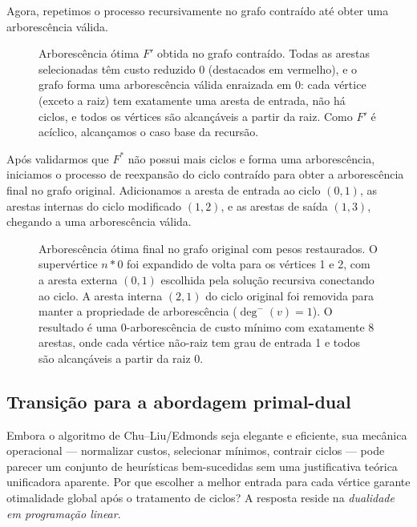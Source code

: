 Agora, repetimos o processo recursivamente no grafo contraído até obter uma arborescência válida.

\begin{figure}[H]
    \centering
    
    \caption{Arborescência ótima $F'$ obtida no grafo contraído. Todas as arestas selecionadas têm custo reduzido 0 (destacados em vermelho), e o grafo forma uma arborescência válida enraizada em 0: cada vértice (exceto a raiz) tem exatamente uma aresta de entrada, não há ciclos, e todos os vértices são alcançáveis a partir da raiz. Como $F'$ é acíclico, alcançamos o caso base da recursão.}
    \label{fig:exemplo-arborescencia-contraida}
\end{figure}

Após validarmos que $F^*$ não possui mais ciclos e forma uma arborescência, iniciamos o processo de reexpansão do ciclo contraído para obter a arborescência final no grafo original. Adicionamos a aresta de entrada ao ciclo $(0, 1)$, as arestas internas do ciclo modificado $(1, 2)$, e as arestas de saída $(1, 3)$, chegando a uma arborescência válida.

\begin{figure}[H]
    \centering
    
    \caption{Arborescência ótima final no grafo original com pesos restaurados. O supervértice $n*0$ foi expandido de volta para os vértices 1 e 2, com a aresta externa $(0, 1)$ escolhida pela solução recursiva conectando ao ciclo. A aresta interna $(2, 1)$ do ciclo original foi removida para manter a propriedade de arborescência ($\deg^{-}(v)=1$). O resultado é uma 0-arborescência de custo mínimo com exatamente 8 arestas, onde cada vértice não-raiz tem grau de entrada 1 e todos são alcançáveis a partir da raiz 0.}
    \label{fig:exemplo-arborescencia-final}
\end{figure}

\subsection{Transição para a abordagem primal-dual}

Embora o algoritmo de Chu–Liu/Edmonds seja elegante e eficiente, sua mecânica operacional — normalizar custos, selecionar mínimos, contrair ciclos — pode parecer um conjunto de heurísticas bem-sucedidas sem uma justificativa teórica unificadora aparente. Por que escolher a melhor entrada para cada vértice garante otimalidade global após o tratamento de ciclos? A resposta reside na \emph{dualidade em programação linear}.


